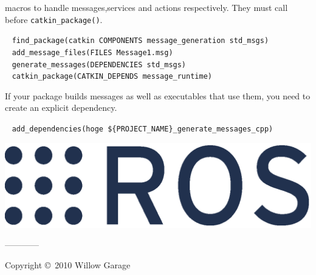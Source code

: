 \documentclass[10pt,landscape]{article}
\newif\ifcatkin
\begin{document}
\begin{multicols}{3}
macros to handle messages,services and actions
respectively. They must call before \texttt{catkin\_package()}.
\vspace{-1.5mm}
\begin{tabbing}
~ \texttt{find\_package(catkin COMPONENTS message\_generation std\_msgs)}\\
~ \texttt{add\_message\_files(FILES Message1.msg)}\\
~ \texttt{generate\_messages(DEPENDENCIES std\_msgs)}\\
~ \texttt{catkin\_package(CATKIN\_DEPENDS message\_runtime)}\\
\end{tabbing}
\vspace{-5mm}
If your package builds messages as well as executables that use them,
you need to create an explicit dependency.
\vspace{-1.5mm}
\begin{tabbing}
~ \texttt{add\_dependencies(hoge \$\{PROJECT\_NAME\}\_generate\_messages\_cpp)}\\
\end{tabbing}

\vspace{-5mm}

\else %

\vspace{17cm}

\fi %

\begin{flushright}
\includegraphics[height=.12\columnwidth]{ros_logo.eps}
\end{flushright}
------------
\scriptsize

Copyright \copyright\ 2010 Willow Garage

\end{multicols}
\end{document}
